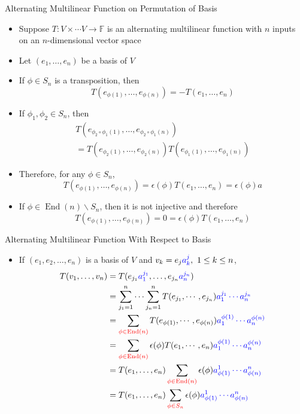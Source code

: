 \documentclass[usenames,dvipsnames,10pt]{beamer}
\newcommand\F{\mathbb{F}}
\newcommand{\End}{\operatorname{End}}
\begin{document}
\begin{frame}
  {Alternating Multilinear Function on Permutation of Basis}

  \begin{itemize}
  \item Suppose $T: V\times\cdots V \rightarrow \F$ is an alternating multilinear function with $n$ inputs on an $n$-dimensional vector space
  \item Let $(e_1, \dots, e_n)$ be a basis of $V$
  \item If $\phi \in S_n$ is a transposition, then
    \[ T(e_{\phi(1)}, \dots, e_{\phi(n)}) = -T(e_1, \dots, e_n) \]
  \item If $\phi_1,\phi_2 \in S_n$, then
    \begin{multline*}
      T(e_{\phi_2\circ\phi_1(1)}, \dots, e_{\phi_2\circ\phi_1(n)})\\
      = T(e_{\phi_2(1)}, \dots, e_{\phi_2(n)})T(e_{\phi_1(1)}, \dots, e_{\phi_1(n)})
    \end{multline*}
  \item Therefore, for any $\phi \in S_n$,
    \[ T(e_{\phi(1)}, \dots, e_{\phi(n)}) = \epsilon(\phi)T(e_1, \dots, e_n) = \epsilon(\phi)a \]
  \item If $\phi\in \End(n)\backslash S_n$, then it is not injective and therefore
    \[ T(e_{\phi(1)}, \dots, e_{\phi(n)}) = 0 = \epsilon(\phi)T(e_1, \dots, e_n) \]
  \end{itemize}
\end{frame}

\begin{frame}
  {Alternating Multilinear Function With Respect to Basis}

  \begin{itemize}
  \item If $(e_1, e_2, \dots, e_n)$ is a basis of $V$ and $v_k = e_j{\color{blue}a^j_k},\ 1 \le k \le n$,
    \begin{align*}
      T(v_1, \dots, v_n) &= T(e_{j_1}{\color{blue}a^{j_1}_1}, \dots, e_{j_n}{\color{blue}a^{j_n}_n})\\
                         &= \sum_{j_1=1}^n\cdots\sum_{j_n=1}^n T(e_{j_1}, \cdots, e_{j_n}){\color{blue}a_1^{j_1}\cdots a_n^{j_n}}\\
                         &= \sum_{\color{red}{\phi\in\End(n)}} T(e_{\phi(1)}, \cdots, e_{\phi(n)}){\color{blue}a_1^{\phi(1)}\cdots a_n^{\phi(n)}}\\
                         &= \sum_{\color{red}{\phi\in\End(n)}} \epsilon(\phi)T(e_1, \cdots, e_n){\color{blue}a_1^{\phi(1)}\cdots a_n^{\phi(n)}}\\
                         &= T(e_1, \dots, e_n)\sum_{\color{red}{\phi\in \End(n)}}\epsilon(\phi) \color{blue}{a^1_{\phi(1)}\cdots a^n_{\phi(n)}}\\
                         &= T(e_1, \dots, e_n)\sum_{\color{red}{\phi\in S_n}}\epsilon(\phi) \color{blue}{a^1_{\phi(1)}\cdots a^n_{\phi(n)}}
    \end{align*}
  \end{itemize}
\end{frame}
\end{document}
